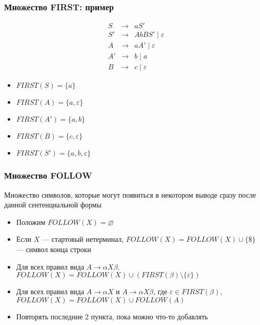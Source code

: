 \documentclass{beamer}
\begin{document}
\begin{frame}[fragile]
  \transwipe[direction=90]
  \frametitle{Множество FIRST: пример}
  \[
  \begin{array}{crcl}
  &S  & \to & a S' \\

  &S' & \to & A b B S' \mid \varepsilon \\

  &A  & \to & a A' \mid \varepsilon \\
  &A' & \to & b \mid a \\
  &B  & \to & c \mid \varepsilon
  \end{array}
  \] \pause

  \begin{itemize}
    \item $FIRST(S) = \{ a \}$ \pause
    \item $FIRST(A) = \{ a, \varepsilon \}$ \pause
    \item $FIRST(A') = \{ a, b \}$ \pause
    \item $FIRST(B) = \{ c, \varepsilon \}$ \pause
    \item $FIRST(S') = \{ a, b, \varepsilon \}$
  \end{itemize}
\end{frame}

\begin{frame}[fragile]
  \transwipe[direction=90]
  \frametitle{Множество FOLLOW}
\begin{center}
  Множество символов, которые могут появиться в некотором выводе сразу после данной сентенциальной формы
\end{center}

  \begin{itemize}

   \item Положим $FOLLOW(X) = \varnothing $
   \item Если $X$ --- стартовый нетерминал, $FOLLOW(X) = FOLLOW(X) \cup \{ \$ \}$ --- символ конца строки
   \item Для всех правил вида $A \to \alpha X \beta$, $FOLLOW(X) = FOLLOW(X) \cup (FIRST(\beta) \setminus \{ \varepsilon\})$
   \item Для всех правил вида $A \to \alpha X$ и $A \to \alpha X \beta$, где $\varepsilon \in FIRST(\beta)$, $FOLLOW(X) = FOLLOW(X) \cup FOLLOW(A)$
   \item Повторять последние 2 пункта, пока можно что-то добавлять
  \end{itemize}
\end{frame}
\end{document}
